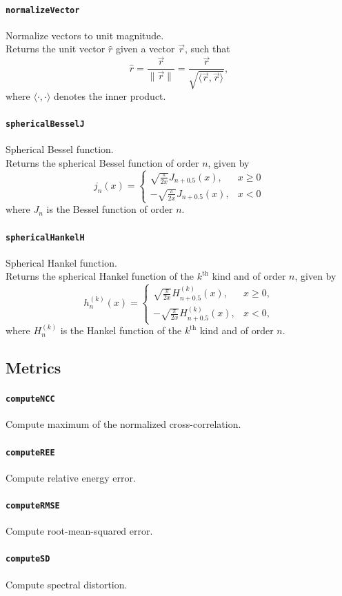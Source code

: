 \documentclass[11pt, oneside]{article}
\newcommand{\function}[1]{\paragraph*{\texttt{#1}}}
\begin{document}
\function{normalizeVector} Normalize vectors to unit magnitude. \\
Returns the unit vector $\hat{r}$ given a vector $\vec{r}$, such that
\begin{equation}
\hat{r} = \frac{\vec{r}}{\|\vec{r}\|} = \frac{\vec{r}}{\sqrt{\langle \vec{r}, \vec{r} \rangle}},
\end{equation}
where $\langle \cdot, \cdot \rangle$ denotes the inner product.

\function{sphericalBesselJ} Spherical Bessel function. \\
Returns the spherical Bessel function of order $n$, given by
\begin{equation}
j_n(x) =
\begin{cases}
\displaystyle \sqrt{\frac{\pi}{2 x}} J_{n+0.5}(x), & x \geq 0 \\
\displaystyle -\sqrt{\frac{\pi}{2 x}} J_{n+0.5}(x), & x < 0
\end{cases}
\end{equation}
where $J_n$ is the Bessel function of order $n$.

\function{sphericalHankelH} Spherical Hankel function. \\
Returns the spherical Hankel function of the $k^\text{th}$ kind and of order $n$, given by
\begin{equation}
h^{(k)}_n(x) =
\begin{cases}
\displaystyle \sqrt{\frac{\pi}{2 x}} H^{(k)}_{n+0.5}(x), & x \geq 0, \\
\displaystyle -\sqrt{\frac{\pi}{2 x}} H^{(k)}_{n+0.5}(x), & x < 0,
\end{cases}
\end{equation}
where $H^{(k)}_n$ is the Hankel function of the $k^\text{th}$ kind and of order $n$.

\subsection{Metrics}

\function{computeNCC} Compute maximum of the normalized cross-correlation. \\

\function{computeREE} Compute relative energy error. \\

\function{computeRMSE} Compute root-mean-squared error. \\

\function{computeSD} Compute spectral distortion. \\
\end{document}
